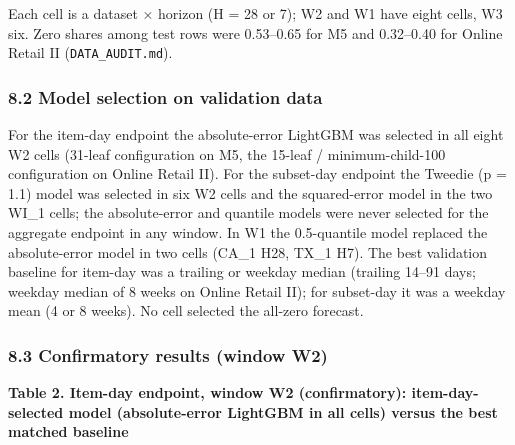 \documentclass[
]{article}
\begin{document}
Each cell is a dataset × horizon (H = 28 or 7); W2 and W1 have eight
cells, W3 six. Zero shares among test rows were 0.53--0.65 for M5 and
0.32--0.40 for Online Retail II (\texttt{DATA\_AUDIT.md}).

\subsubsection{8.2 Model selection on validation
data}\label{model-selection-on-validation-data}

For the item-day endpoint the absolute-error LightGBM was selected in
all eight W2 cells (31-leaf configuration on M5, the 15-leaf /
minimum-child-100 configuration on Online Retail II). For the subset-day
endpoint the Tweedie (p = 1.1) model was selected in six W2 cells and
the squared-error model in the two WI\_1 cells; the absolute-error and
quantile models were never selected for the aggregate endpoint in any
window. In W1 the 0.5-quantile model replaced the absolute-error model
in two cells (CA\_1 H28, TX\_1 H7). The best validation baseline for
item-day was a trailing or weekday median (trailing 14--91 days; weekday
median of 8 weeks on Online Retail II); for subset-day it was a weekday
mean (4 or 8 weeks). No cell selected the all-zero forecast.

\subsubsection{8.3 Confirmatory results (window
W2)}\label{confirmatory-results-window-w2}

\textbf{Table 2. Item-day endpoint, window W2 (confirmatory):
item-day-selected model (absolute-error LightGBM in all cells) versus
the best matched baseline}
\end{document}
